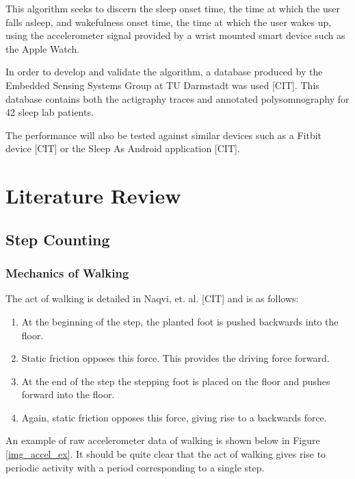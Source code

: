             This algorithm seeks to discern the sleep onset time, the time at which the user falls asleep, and wakefulness onset time, the time at which the user wakes up, using the accelerometer signal provided by a wrist mounted smart device such as the Apple Watch.

            In order to develop and validate the algorithm, a database produced by the Embedded Sensing Systems Group at TU Darmstadt was used [CIT]. This database contains both the actigraphy traces and annotated polysomnography for 42 sleep lab patients.

            The performance will also be tested against similar devices such as a Fitbit device [CIT] or the Sleep As Android application [CIT]. 


    \chapter{Literature Review}


        \section{Step Counting}

            \subsection{Mechanics of Walking}

                The act of walking is detailed in Naqvi, et. al. [CIT] and is as follows:

                \begin{enumerate}
                    \item At the beginning of the step, the planted foot is pushed backwards into the floor.
                    \item Static friction opposes this force. This provides the driving force forward.
                    \item At the end of the step the stepping foot is placed on the floor and pushes forward into the floor.
                    \item Again, static friction opposes this force, giving rise to a backwards force.
                \end{enumerate}

                An example of raw accelerometer data of walking is shown below in Figure \ref{img_accel_ex}. It should be quite clear that the act of walking gives rise to periodic activity with a period corresponding to a single step. 

